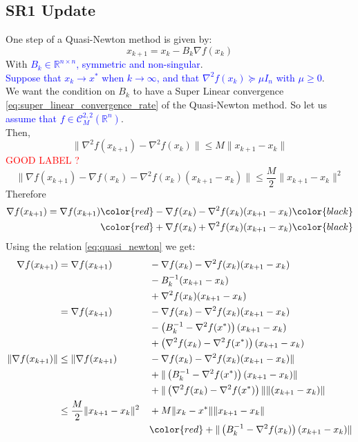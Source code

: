 \documentclass[12pt, openany]{report}
\newcommand{\R}{\mathbb{R}}
\newcommand{\C}{\mathcal{C}}
\theoremstyle{definition}
\begin{document}
\subsection{SR1 Update}
One step of a Quasi-Newton method is given by:
\begin{equation}\label{eq:quasi_newton}
	x_{k+1} = x_k -B_k \nabla f(x_k)
\end{equation}
With \textcolor{blue}{$B_k \in \R^{n\times n}$, symmetric and non-singular}.\\
\textcolor{blue}{Suppose that $x_k \to x^*$ when $k \to \infty$, and that $\nabla^2f(x_k) \succeq \mu I_n$ with $\mu \geq 0$}.\\
We want the condition on $B_k$ to have a Super Linear convergence \eqref{eq:super_linear_convergence_rate} of the Quasi-Newton method. So let us \textcolor{blue}{assume that $f \in \C_M^{2,2}(\R^n)$}.\\
Then,
\begin{equation}\label{eq:bound_hessian_difference}
	\|\nabla^2f(x_{k+1})-\nabla^2f(x_k)\| \leq M \|x_{k+1}-x_k\|
\end{equation}
\textcolor{red}{GOOD LABEL ?}
\begin{equation}\label{eq:M_smoothness}
	\|\nabla f(x_{k+1})-\nabla f(x_k)-\nabla^2 f(x_k)(x_{k+1}-x_k)\| \leq \frac{M}{2} \|x_{k+1}-x_k\|^2
\end{equation}
Therefore
\begin{equation}
	\begin{aligned}
		\nabla f(x_{k+1}) = \nabla f(x_{k+1}) &  \color{red}  - \nabla f(x_k) - \nabla^2 f(x_k) (x_{k+1}-x_k)  \color{black} \\ &  \color{red} + \nabla f(x_k) + \nabla^2 f(x_k) (x_{k+1}-x_k) \color{black}
	\end{aligned}
\end{equation}
Using the relation \eqref{eq:quasi_newton} we get:
\begin{equation}
	\begin{aligned}
		\nabla f(x_{k+1}) &= \nabla f(x_{k+1}) &&- \nabla f(x_k)- \nabla^2 f(x_k) (x_{k+1}-x_k)\\ 
		& &&- B_k^{-1}  (x_{k+1}-x_k)\\ 
		& &&+ \nabla^2 f(x_k) (x_{k+1}-x_k)\\
		&= \nabla f(x_{k+1})  &&- \nabla f(x_k) - \nabla^2 f(x_k) (x_{k+1}-x_k)\\
		& &&- \left(B_k^{-1} - \nabla^2 f(x^*)\right) (x_{k+1}-x_k)\\
		& &&+ \left( \nabla^2 f(x_k) - \nabla^2 f(x^*)\right) (x_{k+1}-x_k)\\
		\|\nabla f(x_{k+1})\| &\leq \|\nabla f(x_{k+1})  &&- \nabla f(x_k) - \nabla^2 f(x_k) (x_{k+1}-x_k) \| \\
		& &&+ \|\left(B_k^{-1} - \nabla^2 f(x^*)\right) (x_{k+1}-x_k)\|\\
		& &&+ \|\left( \nabla^2 f(x_k) - \nabla^2 f(x^*)\right) \| \|(x_{k+1}-x_k)\|\\ 
		&\leq \frac{M}{2} \|x_{k+1}-x_k\|^2 &&+ M \|x_k-x^*\| \|x_{k+1}-x_k\|\\
		& &&\color{red}+ \|\left(B_k^{-1}-\nabla^2f(x_k)\right)(x_{k+1}-x_k)\|
	\end{aligned}
\end{equation}
\end{document}
